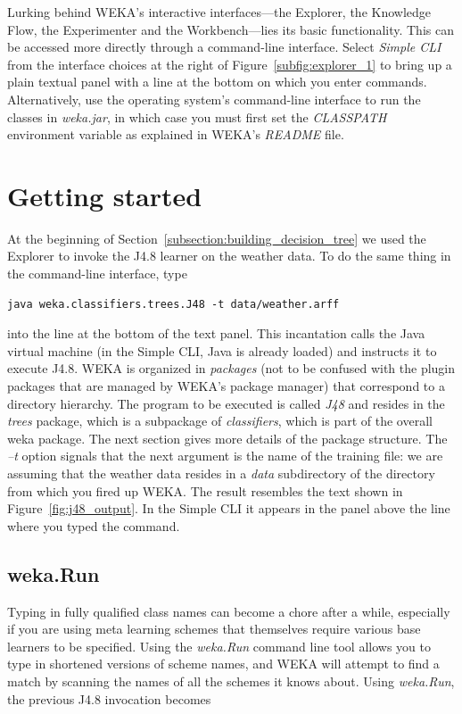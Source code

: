 Lurking behind WEKA's interactive interfaces---the Explorer, the
Knowledge Flow, the Experimenter and the Workbench---lies its basic
functionality. This can be accessed more directly through a
command-line interface. Select \textit{Simple CLI} from the interface
choices at the right of Figure~\ref{subfig:explorer_1} to bring up a
plain textual panel with a line at the bottom on which you enter
commands. Alternatively, use the operating system's command-line
interface to run the classes in \textit{weka.jar}, in which case you
must first set the \textit{CLASSPATH} environment variable as
explained in WEKA's \textit{README} file.

\section{Getting started}

At the beginning of Section~\ref{subsection:building_decision_tree} we
used the Explorer to invoke the J4.8 learner on the weather data. To
do the same thing in the command-line interface, type

\begin{Verbatim}[fontsize=\footnotesize]
java weka.classifiers.trees.J48 -t data/weather.arff
\end{Verbatim}

\noindent into the line at the bottom of the text panel. This
incantation calls the Java virtual machine (in the Simple CLI, Java is
already loaded) and instructs it to execute J4.8. WEKA is organized in
\textit{packages} (not to be confused with the plugin packages that
are managed by WEKA's package manager) that correspond to a directory
hierarchy. The program to be executed is called \textit{J48} and
resides in the \textit{trees} package, which is a subpackage of
\textit{classifiers}, which is part of the overall weka package. The
next section gives more details of the package structure. The
\textit{--t} option signals that the next argument is the name of the
training file: we are assuming that the weather data resides in a
\textit{data} subdirectory of the directory from which you fired up
WEKA. The result resembles the text shown in
Figure~\ref{fig:j48_output}. In the Simple CLI it appears in the panel
above the line where you typed the command.

\subsection{weka.Run}

Typing in fully qualified class names can become a chore after a
while, especially if you are using meta learning schemes that
themselves require various base learners to be specified. Using the
\textit{weka.Run} command line tool allows you to type in shortened versions of
scheme names, and WEKA will attempt to find a match by scanning the
names of all the schemes it knows about. Using {\em weka.Run}, the previous
J4.8 invocation becomes

